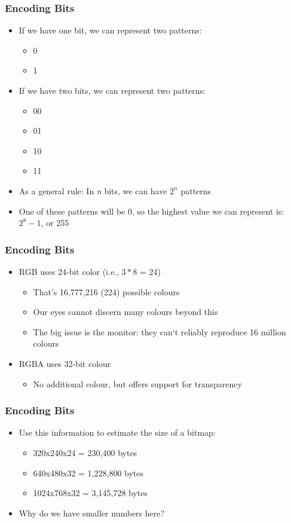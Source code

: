 \begin{frame}
	\frametitle{Encoding Bits}
	
	\begin{itemize}
		\item If we have one bit, we can represent two patterns:
		\begin{itemize}
			\item 0
			\item 1
		\end{itemize}
		
		\item If we have two bits, we can represent two patterns:
		\begin{itemize}
			\item 00
			\item 01
			\item 10
			\item 11
		\end{itemize}
		\item As a general rule: In \textit{n} bits, we can have $2^n$ patterns
		\item One of these patterns will be 0, so the highest value we can represent is: $2^8 - 1$, or 255
	\end{itemize}
\end{frame}

\begin{frame}
	\frametitle{Encoding Bits}
	\begin{itemize}
		\item RGB uses 24-bit color (i.e., $3 * 8$ = 24)
		\begin{itemize}
			\item That's 16,777,216 (224) possible colours
			\item Our eyes cannot discern many colours beyond this
			\item The big issue is the monitor: they can`t reliably reproduce 16 million colours
		\end{itemize}
		\item RGBA uses 32-bit colour
		\begin{itemize}
			\item No additional colour, but offers support for transparency
		\end{itemize}
	\end{itemize}
\end{frame}

\begin{frame}
	\frametitle{Encoding Bits}
	\begin{itemize}
		\item Use this information to estimate the size of a bitmap:
		\begin{itemize}
			\item 320x240x24 = 230,400 bytes
			\item 640x480x32 = 1,228,800 bytes
			\item 1024x768x32 = 3,145,728 bytes
		\end{itemize}
		\item Why do we have smaller numbers here?
	\end{itemize}
\end{frame}

